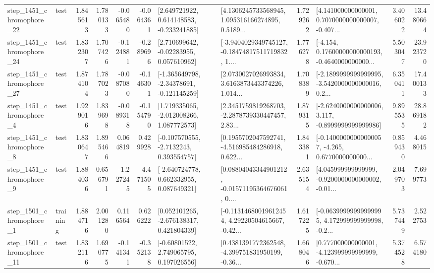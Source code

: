 \begin{tabular}{llrrrrllrlrr}
 step\_1451\_chromophore\_22 &      test &      1.845613 &    1.780133 &     -0.065480 & -0.064361 &    [2.649721922, 0.614148583, -0.233241885] &  [4.1306245733568945, 1.095316166274895, 0.5189... &       1.729262 &  [4.141000000000001, 0.7070000000000007, -0.407... &            3.406022 &         13.480664 \\
 step\_1451\_chromophore\_24 &      test &      1.832307 &    1.707426 &     -0.124881 & -0.289696 &     [2.710699642, -0.02283955, 0.057610962] &  [-3.9404029349745127, -0.18474817511719832, 1.... &       1.776278 &  [-4.154, 0.17600000000000193, -0.4640000000000... &            5.503047 &         23.923720 \\
 step\_1451\_chromophore\_27 &      test &      1.874104 &    1.787023 &     -0.087080 & -0.146301 &   [-1.365649798, -2.34378691, -0.121145259] &  [2.0730027026993834, 3.6163873443374226, 1.014... &       1.708389 &  [-2.1899999999999995, -3.5420000000000016, 0.2... &            6.350411 &         17.400133 \\
  step\_1451\_chromophore\_4 &      test &      1.929016 &    1.839698 &     -0.089318 & -0.154790 &    [1.719335065, -2.012008266, 1.087772573] &  [2.3451759819268703, -2.2878739330447457, 2.83... &       1.879315 &  [-2.6240000000000006, 3.117, -0.8999999999999986] &            9.895535 &         28.869182 \\
  step\_1451\_chromophore\_8 &      test &      1.830647 &    1.895466 &      0.064819 &  0.429928 &     [-0.107570555, -2.7132243, 0.393554757] &  [0.1955702047592741, -4.516985484286918, 0.622... &       1.843381 &  [-0.14000000000000057, -4.265, 0.6770000000000... &            0.859430 &          4.468015 \\
  step\_1451\_chromophore\_9 &      test &      1.884036 &    0.656791 &     -1.227245 & -4.471505 &    [-2.640724778, 0.662332955, 0.087649321] &  [0.08804043344901212, -0.01571195364676061, 0.... &       2.635154 &  [4.045999999999999, -0.9200000000000002, -0.01... &            2.049703 &          7.699773 \\
  step\_1501\_chromophore\_1 &  training &      1.884716 &    2.001280 &      0.116564 &  0.626222 &    [0.052101265, -2.676138317, 0.421804339] &  [-0.11314680019612454, 4.29220504615667, -0.42... &       1.617225 &  [-0.06399999999999995, 4.172999999999998, -0.2... &            5.737449 &          2.522753 \\
 step\_1501\_chromophore\_11 &      test &      1.832116 &    1.690775 &     -0.141341 & -0.352138 &     [-0.60801522, 2.749065795, 0.197026556] &  [0.4381391772362548, -4.399751831950199, -0.36... &       1.668046 &  [0.777000000000001, -4.123999999999999, -0.670... &            5.374528 &          6.574180 \\

\end{tabular}
